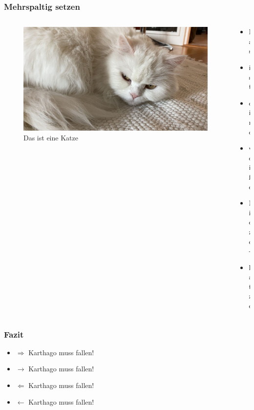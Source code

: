 \documentclass[ngerman]{beamer}
\begin{document}
\begin{frame}
\frametitle{Mehrspaltig setzen}

\begin{columns}

\begin{column}{0.7\textwidth}
\begin{figure}
	\centering
	\includegraphics[width=\textwidth]{miau.jpg}
	\caption{Das ist eine Katze}\label{fig:mieze}
\end{figure}
\end{column}

\begin{column}{0.29\textwidth}
\begin{itemize}
	\item Das
	\item ist 
	\item eine
	\item weiße
	\item Mieze-
	\item katze
	\end{itemize}
\end{column}

\end{columns}


\end{frame}


\begin{frame}
	\frametitle{Fazit}
	
\begin{itemize}
	\item $\Rightarrow$ Karthago muss fallen! \pause
	\item $\rightarrow$ Karthago muss fallen!	\pause
	\item $\Leftarrow$ Karthago muss fallen! \pause
	\item $\leftarrow$ Karthago muss fallen!	
\end{itemize}	

\end{frame}
\end{document}
